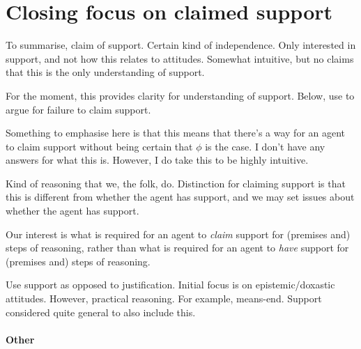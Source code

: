 


\section{Closing focus on claimed support}

\begin{note}
  To summarise, claim of support.
  Certain kind of independence.
  Only interested in support, and not how this relates to attitudes.
  Somewhat intuitive, but no claims that this is the only understanding of support.

  For the moment, this provides clarity for understanding of support.
  Below, use to argue for failure to claim support.
\end{note}

\begin{note}
  \color{red}
  Something to emphasise here is that this means that there's a way for an agent to claim support without being certain that \(\phi\) is the case.
  I don't have any answers for what this is.
  However, I do take this to be highly intuitive.
\end{note}


\begin{note}[Adequate]
  Kind of reasoning that we, the folk, do.
  Distinction for claiming support is that this is different from whether the agent has support, and we may set issues about whether the agent has support.

  Our interest is what is required for an agent to \emph{claim} support for (premises and) steps of reasoning, rather than what is required for an agent to \emph{have} support for (premises and) steps of reasoning.

  Use support as opposed to justification.
  Initial focus is on epistemic/doxastic attitudes.
  However, practical reasoning.
  For example, means-end.
  Support considered quite general to also include this.
\end{note}

\paragraph{Other }

